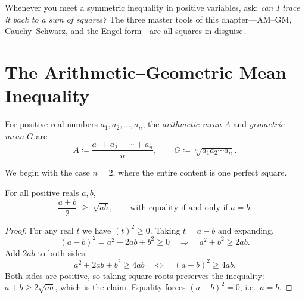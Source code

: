 \begin{keyidea}\label{key:source}
Whenever you meet a symmetric inequality in positive variables, ask:
\emph{can I trace it back to a sum of squares?} The three master tools
of this chapter---AM--GM, Cauchy--Schwarz, and the Engel form---are
all squares in disguise.
\end{keyidea}

\section{The Arithmetic--Geometric Mean Inequality}
\label{sec:amgm}

\begin{definition}\label{def:amgm}
For positive real numbers $a_1, a_2, \dots, a_n$, the
\emph{arithmetic mean} $A$ and \emph{geometric mean} $G$ are
\[
  A \coloneqq \frac{a_1 + a_2 + \cdots + a_n}{n},
  \qquad
  G \coloneqq \sqrt[n]{a_1 a_2 \cdots a_n}.
\]
\end{definition}

We begin with the case $n = 2$, where the entire content is one
perfect square.

\begin{theorem}\label{thm:amgm2}
For all positive reals $a, b$,
\[
  \frac{a+b}{2} \;\ge\; \sqrt{ab},
  \qquad\text{with equality if and only if } a = b.
\]
\end{theorem}

\begin{proof}
For any real $t$ we have $(t)^2 \ge 0$. Taking $t = a - b$ and
expanding,
\[
  (a-b)^2 = a^2 - 2ab + b^2 \ge 0
  \quad\Longrightarrow\quad
  a^2 + b^2 \ge 2ab .
\]
Add $2ab$ to both sides:
\[
  a^2 + 2ab + b^2 \ge 4ab
  \quad\Longleftrightarrow\quad
  (a+b)^2 \ge 4ab .
\]
Both sides are positive, so taking square roots preserves the
inequality: $a + b \ge 2\sqrt{ab}$, which is the claim. Equality
forces $(a-b)^2 = 0$, i.e.\ $a = b$.
\end{proof}

